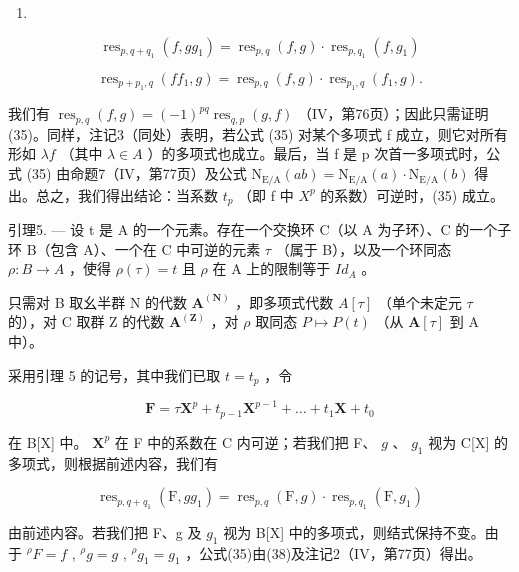 \begin{enumerate}
\def\labelenumi{(\arabic{enumi})}
\setcounter{enumi}{34}
\tightlist
\item
\end{enumerate}

\[
\operatorname{res} _ {p, q + q _ {1}} (f, g g _ {1}) = \operatorname{res} _ {p, q} (f, g) \cdot \operatorname{res} _ {p, q _ {1}} (f, g _ {1})\tag{36}
\]

\[
\operatorname{res} _ {p + p _ {1}, q} (f f _ {1}, g) = \operatorname{res} _ {p, q} (f, g) \cdot \operatorname{res} _ {p _ {1}, q} (f _ {1}, g).
\]

我们有 \(\operatorname{res}_{p,q}(f,g)=(-1)^{pq}\operatorname{res}_{q,p}(g,f)\) （IV，第76页）；因此只需证明 (35)。同样，注记3（同处）表明，若公式 (35) 对某个多项式 f 成立，则它对所有形如 \(\lambda f\) （其中 \(\lambda\in A\) ）的多项式也成立。最后，当 f 是 p 次首一多项式时，公式 (35) 由命题7（IV，第77页）及公式 \(\mathrm{N}_{\mathrm{E}/\mathrm{A}}(ab)=\mathrm{N}_{\mathrm{E}/\mathrm{A}}(a)\cdot\mathrm{N}_{\mathrm{E}/\mathrm{A}}(b)\) 得出。总之，我们得出结论：当系数 \(t_{p}\) （即 f 中 \(X^{p}\) 的系数）可逆时，(35) 成立。

引理5. --- 设 t 是 A 的一个元素。存在一个交换环 C（以 A 为子环）、C 的一个子环 B（包含 A）、一个在 C 中可逆的元素 \(\tau\) （属于 B），以及一个环同态 \(\rho: B \to A\) ，使得 \(\rho(\tau) = t\) 且 \(\rho\) 在 A 上的限制等于 \(Id_{A}\) 。

只需对 B 取幺半群 N 的代数 \(\mathbf{A}^{(\mathbf{N})}\) ，即多项式代数 \(A[\tau]\) （单个未定元 \(\tau\) 的），对 C 取群 Z 的代数 \(\mathbf{A}^{(\mathbf{Z})}\) ，对 \(\rho\) 取同态 \(P \mapsto P(t)\) （从 \(\mathbf{A}[\tau]\) 到 A 中）。

采用引理 5 的记号，其中我们已取 \(t = t_p\) ，令

\[
\mathbf {F} = \tau \mathbf {X} ^ {p} + t _ {p - 1} \mathbf {X} ^ {p - 1} + \dots + t _ {1} \mathbf {X} + t _ {0}\tag{37}
\]

在 B{[}X{]} 中。 \(\mathbf{X}^p\) 在 F 中的系数在 C 内可逆；若我们把 F、 \(g\) 、 \(g_1\) 视为 C{[}X{]} 的多项式，则根据前述内容，我们有

\[
\operatorname{res} _ {p, q + q _ {1}} (\mathrm{F}, g g _ {1}) = \operatorname{res} _ {p, q} (\mathrm{F}, g) \cdot \operatorname{res} _ {p, q _ {1}} (\mathrm{F}, g _ {1})\tag{38}
\]

由前述内容。若我们把 F、g 及 \(g_{1}\) 视为 B{[}X{]} 中的多项式，则结式保持不变。由于 \( {}^{\rho}F = f\) , \( {}^{\rho}g = g\) , \( {}^{\rho}g_{1} = g_{1}\) ，公式(35)由(38)及注记2（IV，第77页）得出。

